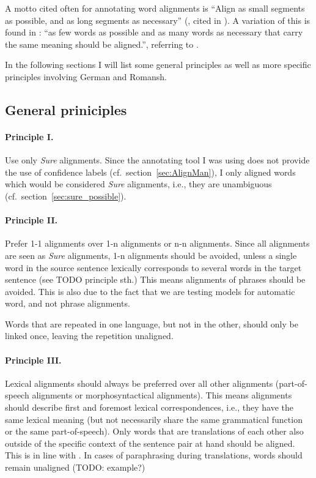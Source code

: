 A motto cited often for annotating word alignments is \enquote{Align as small segments as possible, and as long segments as necessary} (\cite{Vronis00evaluationof}, cited in \cite{lines2007}). A variation of this is found in \cite{clematide2018}: \enquote{as few words as possible and as many words as necessary that carry the same meaning should be aligned.}, referring to \cite{lambert2005}. 

In the following sections I will list some general principles as well as more specific principles involving German and Romansh.

\subsection{General priniciples}
\paragraph{Principle I.} 
Use only \emph{Sure} alignments. 
Since the annotating tool I was using does not provide the use of confidence labels (cf.~section~\ref{sec:AlignMan}), I only aligned words which would be considered \emph{Sure} alignments, i.e., they are unambiguous (cf.~section~\ref{sec:sure_possible}). 


\paragraph{Principle II.}
Prefer 1-1 alignments over 1-n alignments or n-n alignments. 
Since all alignments are seen as \emph{Sure} alignments, 1-n alignments should be avoided, unless a single word in the source sentence lexically corresponds to several words in the target sentence (see TODO principle sth.)
This means alignments of phrases should be avoided. This is also due to the fact that we are testing models for automatic word, and not phrase alignments.


Words that are repeated in one language, but not in the other, should only be linked once, leaving the repetition unaligned.

\paragraph{Principle III.}
Lexical alignments should always be preferred over all other alignments (part-of-speech alignments or morphosyntactical alignments). 
This means alignments should describe first and foremost lexical correspondences, i.e., they have the same lexical meaning (but not necessarily share the same grammatical function or the same part-of-speech).
Only words that are translations of each other also outside of the specific context of the sentence pair at hand should be aligned. This is in line with \cite{clematide2018}.
In cases of paraphrasing during translations, words should remain unaligned (TODO: example?)

